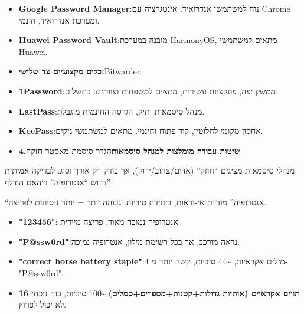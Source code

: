 

\begin{itemize}
  \item \textbf{Google Password Manager}:נוח למשתמשי אנדרואיד. אינטגרציה עם Chrome ומערכת אנדרואיד, חינמי.
  \item \textbf{Huawei Password Vault}:מובנה במערכת HarmonyOS, מתאים למשתמשי Huawei.
  \item \textbf{כלים מקצועיים צד שלישי:}Bitwarden
\end{itemize}


\begin{itemize}
  \item \textbf{1Password}:ממשק יפה, פונקציות עשירות, מתאים למשפחות וצוותים. בתשלום.
  \item \textbf{LastPass}:מנהל סיסמאות ותיק, הגרסה החינמית מוגבלת.
  \item \textbf{KeePass}:אחסון מקומי לחלוטין, קוד פתוח וחינמי. מתאים למשתמשי גיקים.
  \item \textbf{4.שיטות עבודה מומלצות למנהל סיסמאות}הגדר סיסמת מאסטר חזקה
\end{itemize}


מנהלי סיסמאות מציגים “חוזק” (אדום/צהוב/ירוק), אך בודק רק אורך וסוג. לבדיקה אמיתית דרוש “אנטרופיה” ו“האם הודלף”.


“אנטרופיה” מודדת אי-ודאות, ביחידת סיביות. גבוהה יותר = יותר ניסיונות לפריצה.

\begin{itemize}
  \item \textbf{"123456"}: אנטרופיה נמוכה מאוד, פריצה מיידית.
  \item \textbf{"P@ssw0rd"}:נראה מורכב, אך בכל רשימת מילון, אנטרופיה נמוכה.
  \item \textbf{"correct horse battery staple"}:4 מילים אקראיות, \textasciitilde{}44 סיביות, קשה יותר מ-"P@ssw0rd".
  \item \textbf{16 תווים אקראיים (אותיות גדולות+קטנות+מספרים+סמלים)}:\textasciitilde{}100 סיביות, כוח נוכחי לא יכול לפרוץ.
\end{itemize}

